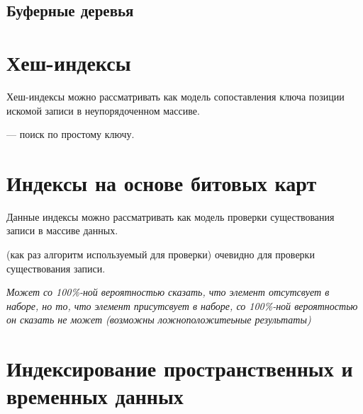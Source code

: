 \subsection{Буферные деревья}


\section{Хеш-индексы}

Хеш-индексы можно рассматривать как модель сопоставления ключа позиции
искомой записи в неупорядоченном массиве.

 --- поиск по простому ключу.

\section{Индексы на основе битовых карт}

Данные индексы можно рассматривать как модель проверки существования записи в
массиве данных.

 (как раз алгоритм используемый для проверки) очевидно
 для проверки существования записи.

\textit{Может со 100\%-ной вероятностью сказать, что элемент отсутсвует в
наборе, но то, что элемент присутсвует в наборе, со 100\%-ной вероятностью он
сказать не может (возможны ложноположитеьные результаты)}

\section{Индексирование пространственных и временных данных}
